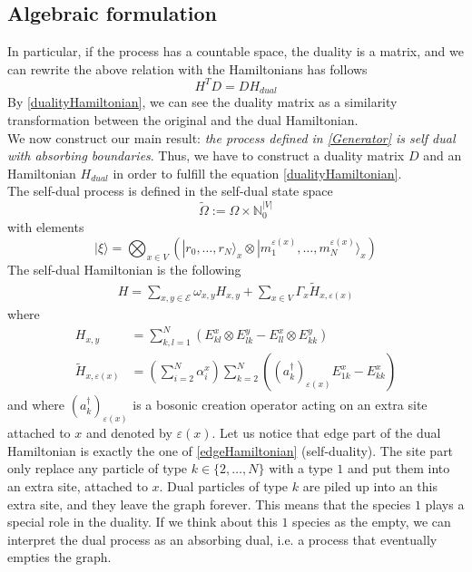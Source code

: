 \documentclass[11pt]{article}
\numberwithin{equation}{section}
\begin{document}
\subsection{Algebraic formulation}
In particular, if the process has a countable space, the duality is a matrix, and we can rewrite the above relation with the Hamiltonians has follows
\begin{equation}\label{dualityHamiltonian}
    H^{T}D=DH_{dual}
\end{equation}
By \eqref{dualityHamiltonian}, we can see the duality matrix as a similarity transformation between the original and the dual Hamiltonian. \\
We now construct our main result: \textit{the process defined in \eqref{Generator} is self dual with absorbing boundaries}. Thus, we have to construct a duality matrix $D$ and an Hamiltonian $H_{dual}$ in order to fulfill the equation \eqref{dualityHamiltonian}.
\\
The self-dual process is defined in the self-dual state space 
\begin{equation}\widetilde{\Omega}:=\Omega\times \mathbb{N}_{0}^{|V|}\end{equation} with elements
\begin{equation}
	|\xi\rangle=\bigotimes_{x\in V}\left(|r_{0},\ldots,r_{N}\rangle_{x}\otimes |m_{1}^{\varepsilon(x)},\ldots,m_{N}^{\varepsilon(x)}\rangle_{x}\right)
\end{equation}
The self-dual Hamiltonian is the following
\begin{equation}
	\begin{split}
		H=\sum_{x,y\in \mathcal{E}}\omega_{x,y}H_{x,y}+\sum_{x\in V}\Gamma_{x}\widetilde{H}_{x,\varepsilon(x)}
	\end{split}
\end{equation}
where
\begin{align}
H_{x,y}&=\sum_{k,l=1}^{N}\left(E_{kl}^{x}\otimes E_{lk}^{y}-E_{ll}^{x}\otimes E_{kk}^{y}\right)\\
\widetilde{H}_{x,\varepsilon(x)}&=\left(\sum_{i=2}^{N}\alpha_{i}^{x}\right)\sum_{k=2}^{N}\left((a^{\dagger}_{k})_{\varepsilon(x)}E_{1k}^{x}-E_{kk}^{x}\right)
\end{align}
and where  $(a^{\dagger}_{k})_{\varepsilon(x)}$ is a bosonic creation operator acting on an extra site attached to $x$ and denoted by $\varepsilon(x)$. Let us notice that edge part of the dual Hamiltonian is exactly the one of \eqref{edgeHamiltonian} (self-duality). The site part only replace any particle of type $k\in \{2,\ldots,N\}$ with a type $1$  and put them into an extra site, attached to $x$. Dual particles of type $k$ are piled up into an this extra site, and they leave the graph forever. This means that the species $1$ plays a special role in the duality. If we think about this $1$ species as the empty, we can interpret the dual process as an absorbing dual, i.e. a process that eventually empties the graph.\\
\end{document}

